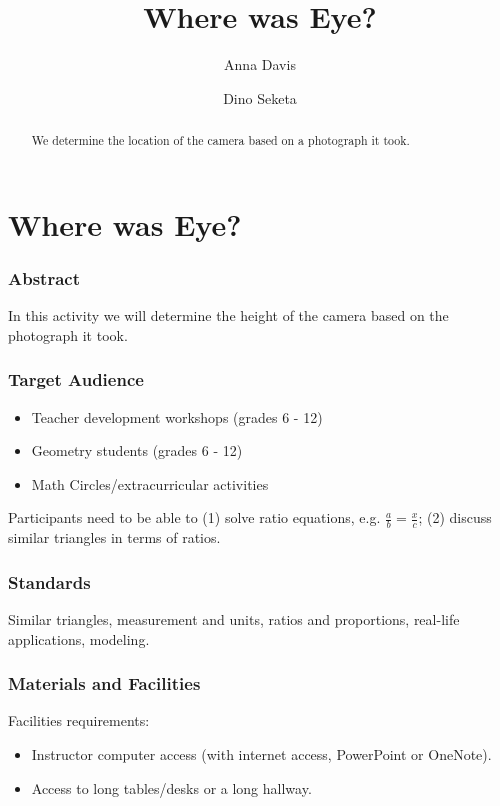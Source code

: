 \documentclass{ximera}
\author{Anna Davis \and Dino Seketa} \license{CC-BY 4.0}
\title{Where was Eye?} \license{CC BY-NC-SA 4.0}
\begin{document}
\begin{abstract}
We determine the location of the camera based on a photograph it took.
\end{abstract}
\maketitle

\section*{Where was Eye?}

\subsubsection*{Abstract}
In this activity we will determine the height of the camera based on the photograph it took. 

\subsubsection*{Target Audience}
\begin{itemize}
    \item Teacher development workshops (grades 6 - 12)
    \item Geometry students (grades 6 - 12)
    \item Math Circles/extracurricular activities
\end{itemize}

Participants need to be able to (1) solve ratio equations, e.g. $\frac{a}{b}=\frac{x}{c}$; (2) discuss similar triangles in terms of ratios.

\subsubsection*{Standards}
Similar triangles, measurement and units, ratios and proportions, real-life applications, modeling. 

\subsubsection*{Materials and Facilities}
Facilities requirements:
\begin{itemize}
    \item Instructor computer access (with internet access, PowerPoint or OneNote).
    \item Access to long tables/desks or a long hallway.
\end{itemize}
\end{document}
